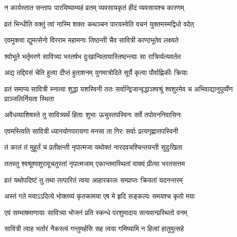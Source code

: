\begin{center}



\twolineshloka
{न कार्यस्तात सन्तापः पारयिष्याम्यहं व्रतम्}
{व्यवसायकृतं हीदं व्यवसायश्च कारणम्}




\twolineshloka
{व्रतं भिन्धीति वक्तुं त्वां नास्मि शक्तः कथञ्चन}
{पारयस्वेति वचनं युक्तमस्मद्विधो वदेत्}




\twolineshloka
{एवमुक्त्वा द्युमत्सेनो विरराम महामनाः}
{तिष्ठन्ती चैव सावित्री काण्ठभूतेव लक्ष्यते}


\twolineshloka
{श्वोभूते भर्तृमरणे सावित्र्या भरतर्षभ}
{दुःखान्वितायास्तिष्ठन्त्याः सा रात्रिर्व्यत्यवर्तत}


\twolineshloka
{अद्य तद्दिवसं चेति हुत्वा दीप्तं हुताशनम्}
{युगमात्रोदिते सूर्ये कृत्वा पौर्वाह्णिकीः क्रियाः}


\threelineshloka
{व्रतं समाप्य सावित्री स्नात्वा शुद्धा यशस्विनी}
{ततः सर्वान्द्विजान्वृद्धाञ्श्वश्रूं श्वशुरमेव च}
{अभिवाद्यानुपूर्व्येण प्राञ्जलिर्नियता स्थिता}


\twolineshloka
{अवैधव्याशिषस्ते तु सावित्र्यर्थं हिताः शुभाः}
{ऊचुस्तपस्विनः सर्वे तपोवननिवासिनः}


\twolineshloka
{एवमस्त्विति सावित्री ध्यानयोगपरायणा}
{मनसा ता गिरः सर्वाः प्रत्यगृह्णात्तपस्विनी}


\twolineshloka
{तं कालं तं मुहूर्तं च प्रतीक्षन्ती नृपात्मजा}
{यथोक्तं नारदवचश्चिन्तयन्ती सुदुःखिता}


\twolineshloka
{ततस्तु श्वश्रूश्वशुरावूचतुस्तां नृपात्मजाम्}
{एकान्तमास्थितां वाक्यं प्रीत्या भरतसत्तम}


\twolineshloka
{व्रतं यथोपदिष्टं तु तथा तत्पारितं त्वया}
{आहारकालः सम्प्राप्तः क्रियतां यदनन्तरम्}




\twolineshloka
{अस्तं गते मयाऽऽदित्ये भोक्तव्यं कृतकामया}
{एष मे हृदि सङ्कल्पः समयश्च कृतो मया}




\twolineshloka
{एवं सम्भाषमाणायाः सावित्र्या भोजनं प्रति}
{स्कन्धे परशुमादाय सत्यवान्प्रस्थितो वनम्}


\twolineshloka
{सावित्री त्वाह भर्तारं नैकस्त्वं गन्तुमर्हसि}
{सह त्वया गमिष्यामि न हित्वां हातुमुत्सहे}


\end{center}
